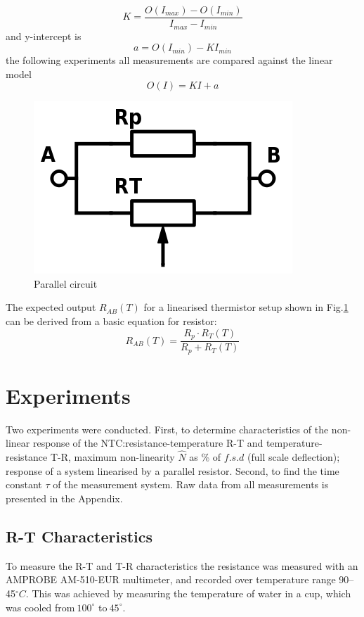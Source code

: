 \documentclass[a4,11pt]{article}
\begin{document}
$$K=\frac{O(I_{max})-O(I_{min})}{I_{max}-I_{min}}$$
and y-intercept is
\begin{equation}
  \label{eq:intercept}
  a=O(I_{min})-KI_{min}
\end{equation}
the following experiments all measurements are compared against the linear model
\begin{equation}
  O(I)=KI+a
\end{equation}
\begin{figure}[H]
  \label{fig:parallel}
  \centering
  \includegraphics[width=0.75\columnwidth]{parallel.png}
  \caption{
    Parallel circuit
  }
\end{figure}
The expected output $R_{AB}(T)$ for a linearised thermistor setup shown in Fig.\ref{fig:parallel} can be derived from a basic equation for resistor:
\begin{equation}
  \label{eq:Rab}
  R_{AB}(T)=\frac{R_p\cdot R_T(T)}{R_p+R_T(T)}
\end{equation}
\section{Experiments}
Two experiments were conducted. First, to determine characteristics of the non-linear response of the NTC:\@ resistance-temperature R-T and temperature-resistance T-R, maximum non-linearity $\hat N$ as \% of $f.s.d$ (full scale deflection); response of a system linearised by a parallel resistor. Second, to find the time constant $\tau$ of the measurement system. Raw data from all measurements is presented in the Appendix.
\subsection{R-T Characteristics}

To measure the R-T and T-R characteristics the resistance was measured with an AMPROBE AM-510-EUR multimeter, and recorded over temperature range 90--45$^{\circ}C$. This was achieved by measuring the temperature of water in a cup, which was cooled from$~100^{\circ}$ to$~45^{\circ}$.
\end{document}
